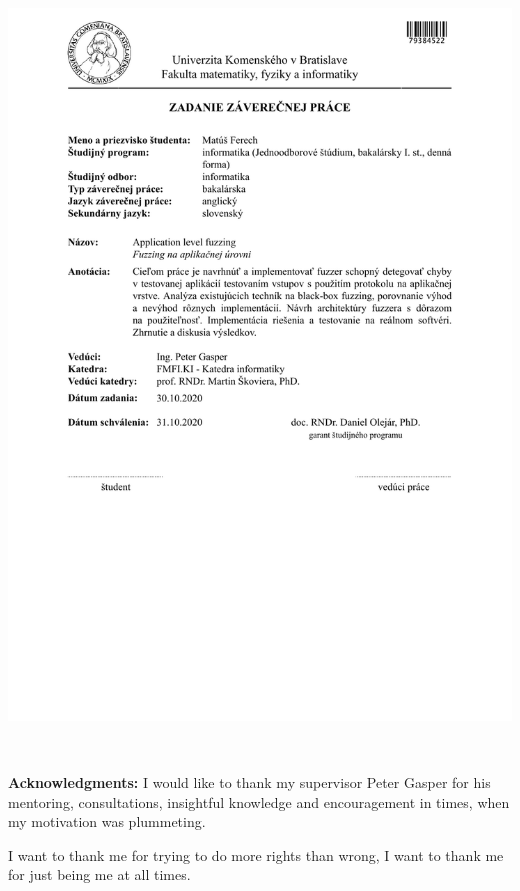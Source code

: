 \documentclass[12pt, twoside]{book}
\begin{document}
\hspace{-2cm}\includegraphics[width=1.1\textwidth]{images/assignment-sk}


\frontmatter

\setcounter{page}{7}
\newpage
~

\vfill
{\bf Acknowledgments:} I would like to thank my supervisor Peter Gasper for his mentoring, consultations, insightful knowledge and encouragement in times, when my motivation was plummeting.

I want to thank me for trying to do more rights than wrong, I want to thank me for just being me at all times.


\newpage
\end{document}
